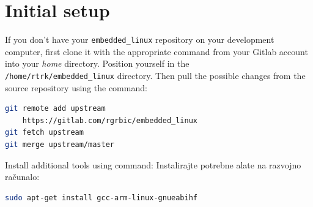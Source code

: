 \documentclass[11pt]{article}
\begin{document}
\section{Initial setup}
If you don't have your \texttt{embedded\_linux} repository on your development
 computer, first clone it with the appropriate command from your Gitlab account
 into your \textit{home} directory. Position yourself in the\\
 \texttt{/home/rtrk/embedded\_linux} directory. Then pull the possible changes
 from the source repository using the command:
\begin{lstlisting}[language=bash]
git remote add upstream
	https://gitlab.com/rgrbic/embedded_linux
git fetch upstream
git merge upstream/master
\end{lstlisting}
Install additional tools using command:
Instalirajte potrebne alate na razvojno računalo:
\begin{lstlisting}[language=bash]
sudo apt-get install gcc-arm-linux-gnueabihf
\end{lstlisting}
\end{document}
